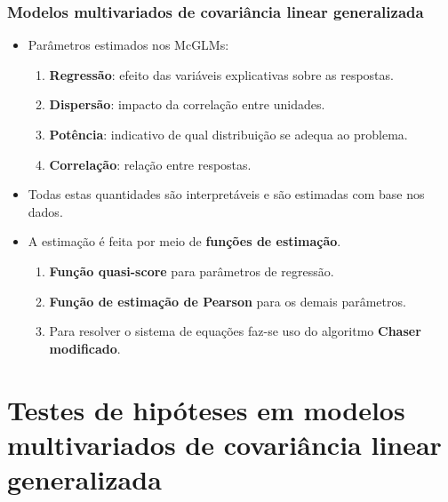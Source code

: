 \documentclass[10pt,
  aspectratio=169,
  serif,
  mathserif,
  professionalfont,
  compress,
  handout,
  ]{beamer}\usepackage[]{graphicx}\usepackage[]{color}
\begin{document}

\begin{frame}
\frametitle{Modelos multivariados de covariância linear generalizada}

\begin{itemize}

\itemsep 2ex
  
  \item Parâmetros estimados nos McGLMs:
    \begin{enumerate}
      \item \textbf{Regressão}: efeito das variáveis explicativas sobre as respostas.
      \item \textbf{Dispersão}: impacto da correlação entre unidades.
      \item \textbf{Potência}: indicativo de qual distribuição se adequa ao problema.
      \item \textbf{Correlação}: relação entre respostas.
    \end{enumerate}
  
  \item Todas estas quantidades são interpretáveis e são estimadas com base nos dados.
  
  \item A estimação é feita por meio de \textbf{funções de estimação}.
    \begin{enumerate}
      \item \textbf{Função quasi-score} para parâmetros de regressão. 
      \item \textbf{Função de estimação de Pearson} para os demais parâmetros. 
      \item Para resolver o sistema de equações faz-se uso do algoritmo
\textbf{Chaser modificado}.
    \end{enumerate}

\end{itemize}

\end{frame}

\section{Testes de hipóteses em modelos multivariados de covariância linear generalizada}
\end{document}
